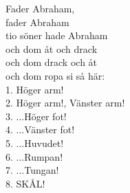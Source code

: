 
            Fader Abraham, \\
            fader Abraham \\
            tio söner hade Abraham \\
            och dom åt och drack \\
            och dom drack och åt \\
            och dom ropa si så här: \\
            1. Höger arm! \\
            2. Höger arm!, Vänster arm! \\
            3. ...Höger fot! \\
            4. ...Vänster fot! \\
            5. ...Huvudet! \\
            6. ...Rumpan! \\
            7. ...Tungan! \\
            8. SKÅL! \\

